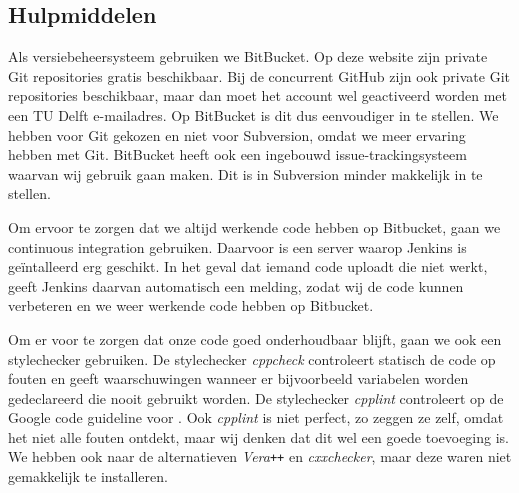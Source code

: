 \subsection{Hulpmiddelen}
Als versiebeheersysteem gebruiken we BitBucket. Op deze website zijn private Git repositories gratis beschikbaar. Bij de concurrent GitHub zijn ook private Git repositories beschikbaar, maar dan moet het account wel geactiveerd worden met een TU Delft e-mailadres. Op BitBucket is dit dus eenvoudiger in te stellen. We hebben voor Git gekozen en niet voor Subversion, omdat we meer ervaring hebben met Git. BitBucket heeft ook een ingebouwd issue-trackingsysteem waarvan wij gebruik gaan maken. Dit is in Subversion minder makkelijk in te stellen.

Om ervoor te zorgen dat we altijd werkende code hebben op Bitbucket, gaan we continuous integration gebruiken. Daarvoor is een server waarop Jenkins is ge\"intalleerd erg geschikt. In het geval dat iemand code uploadt die niet werkt, geeft Jenkins daarvan automatisch een melding, zodat wij de code kunnen verbeteren en we weer werkende code hebben op Bitbucket.  

Om er voor te zorgen dat onze code goed onderhoudbaar blijft, gaan we ook een stylechecker gebruiken. De stylechecker \emph{cppcheck} controleert statisch de code op fouten en geeft waarschuwingen wanneer er bijvoorbeeld variabelen worden gedeclareerd die nooit gebruikt worden. De stylechecker \emph{cpplint} controleert op de Google code guideline voor \cpp. Ook \emph{cpplint} is niet perfect, zo zeggen ze zelf, omdat het niet alle fouten ontdekt, maar wij denken dat dit wel een goede toevoeging is. We hebben ook naar de alternatieven \emph{Vera\texttt{++}} en \emph{cxxchecker}, maar deze waren niet gemakkelijk te installeren.

